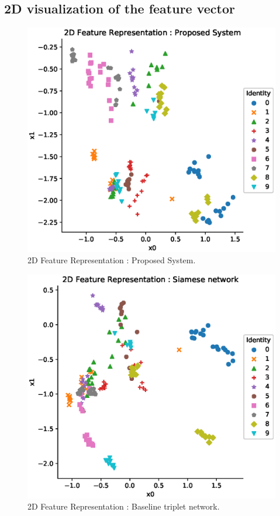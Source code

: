 \subsection{2D visualization of the feature vector}
\begin{figure}[!ht]
    \includegraphics[width=\textwidth]{fig_2d_triKAR_10_v1.eps}
    \caption{2D Feature Representation : Proposed System.} \label{fig_2d_triKAR_10}
\end{figure}
\begin{figure}[!ht]
    \includegraphics[width=\textwidth]{fig_2d_tribase_10_v1.eps}
    \caption{2D Feature Representation : Baseline triplet network.} \label{fig_2d_tribase_10}
\end{figure}
